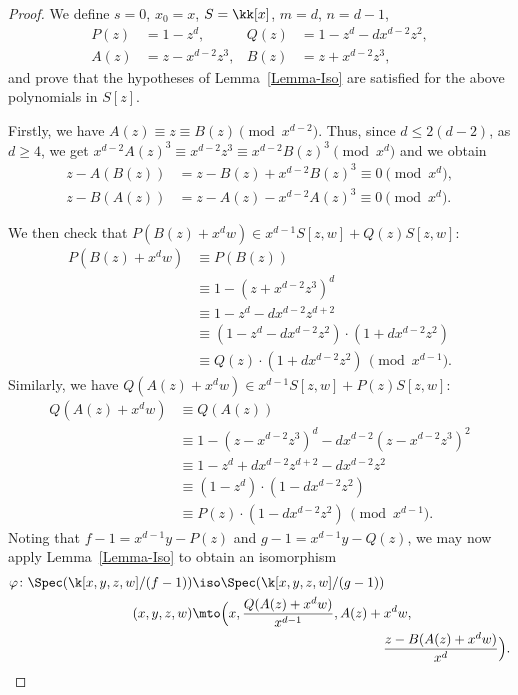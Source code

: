 \begin{proof}
We define $s=0$, $x_0=x$, $S=\kk[x]$, $m=d$, $n=d-1$,
\begin{align*}
P(z)&=1-z^{d}, & Q(z) &=1-z^{d}-dx^{d-2}z^2, \\
A(z)&=z-x^{d-2}z^3, & B(z) &=z+x^{d-2}z^3,
\end{align*}
and prove that the hypotheses of Lemma~\ref{Lemma-Iso} are satisfied for the above polynomials in $S[z]$.

Firstly, we have $A(z)\equiv z\equiv B(z) \pmod{x^{d-2}}$. Thus, since $d\le 2(d-2)$, as $d\ge 4$, we get $x^{d-2}A(z)^3\equiv x^{d-2}z^3\equiv x^{d-2} B(z)^3 \pmod{x^d}$ and we obtain
\begin{align*}
z-A(B(z))&= z-B(z)+x^{d-2}B(z)^3\equiv 0\pmod{x^d}, \\
z-B(A(z))&= z-A(z)-x^{d-2}A(z)^3\equiv 0\pmod{x^d}.
\end{align*}

We then check that $P\left(B(z)+x^{d}w\right)\in x^{d-1}S[z,w]+Q(z)S[z,w]$:
\begin{align*}
P(B(z)+x^{d}w) &\equiv P(B(z)) \\
&\equiv 1 -(z+x^{d-2}z^3)^{d} \\
&\equiv 1-z^{d}-dx^{d-2}z^{d+2}\\
&\equiv (1-z^{d}-dx^{d-2}z^2)\cdot (1+dx^{d-2}z^2)\\
&\equiv Q(z) \cdot (1+dx^{d-2}z^2)\, \pmod{x^{d-1}}.
\end{align*}
Similarly, we have
$Q(A(z)+x^{d}w)\in x^{d-1}S[z,w]+P(z)S[z,w]$:
\begin{align*}
Q(A(z)+x^{d}w) &\equiv Q\left(A(z)\right)\\
& \equiv 1-(z-x^{d-2}z^3)^{d}-dx^{d-2}(z-x^{d-2}z^3)^2 \\
&\equiv 1 -z^{d}+dx^{d-2}z^{d+2}-dx^{d-2}z^2\\
&\equiv (1-z^{d})\cdot (1-dx^{d-2}z^2)\\
&\equiv P(z) \cdot (1-dx^{d-2}z^2)\, \pmod{x^{d-1}}.
\end{align*}
Noting that $f-1=x^{d-1}y-P(z)$ and $g-1=x^{d-1}y-Q(z)$, we may now apply Lemma~\ref{Lemma-Iso} to obtain an isomorphism
\begin{align*}
\varphi\colon\Spec(\k[x,y,z,w]/(f-1)) & \iso \Spec(\k[x,y,z,w]/(g-1)) \\
(x,y,z,w) & \mto \Bigl(x,\frac{Q(A(z)+x^{d}w)}{x^{d-1}},
A(z)+x^{d}w,\\
&\hspace*{5cm}\frac{z-B(A(z)+x^{d}w)}{x^{d}}\Bigr).
\end{align*}


\end{proof}
